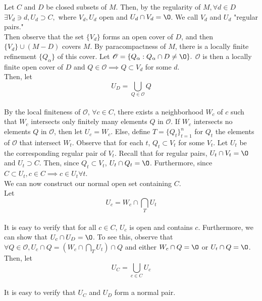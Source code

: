 \documentclass[paper=a4, fontsize=11pt]{scrartcl} %
\numberwithin{equation}{section} %
\numberwithin{figure}{section} %
\numberwithin{table}{section} %
\begin{document}
Let $C$ and $D$ be closed subsets of $M$. Then, by the regularity of $M, \forall d \in D$  $\exists V_d \ni d, U_d \supset C,$ where $V_d, U_d$ open and $U_d \cap V_d = \O $. We call $V_d$ and $U_d$ "regular pairs." \\

Then observe that the set $\{V_d\}$ forms an open cover of $D$, and then $\{V_d\} \cup (M - D)$ covers $M$. By paracompactness of $M$, there is a locally finite refinement $\{Q_{\alpha}\}$ of this cover. Let $\mathscr{O}  = \{Q_{\alpha} : Q_{\alpha} \cap D \not = \O \}.$ $\mathscr{O}$ is then a locally finite open cover of $D$ and $Q \in \mathscr{O} \implies Q \subset V_d$ for some $d$. \\

Then, let \[U_D = \bigcup_{Q \in \mathscr{O} } Q \] \\

By the local finiteness of $ \mathscr{O} $, $ \forall c \in C$, there exists a neighborhood $W_c$ of  $c$ such that $W_c$ intersects only finitely many elements $Q$ in  $\mathscr{O}$. If $W_c$ intersects no elements $Q$ in  $\mathscr{O}$, then let $U_c = W_c$. Else, define $T = \{ Q_t\}_{t = 1}^{n} $ for $Q_t$ the elements of $\mathscr{O}$ that intersect $W_t$. Observe that for each $t$, $Q_t \subset V_t$ for some $V_t$. Let $U_t$ be the corresponding regular pair of $V_t$. Recall that for regular pairs, $U_t \cap V_t = \O$ and $U_t \supset C$. Then, since $Q_t \subset V_t$, $U_t \cap Q_t = \O$. Furthermore, since $C \subset U_t, c \in C \implies c \in U_t \forall t$. \\

We can now construct our normal open set containing $C$. \\ Let \[ U_c = W_c \cap \bigcap_T U_t  \] \\
It is easy to verify that for all $c \in C$, $U_c$ is open and contains $c$. Furthermore, we can show that $U_c \cap U_D = \O $. To see this, observe that $\forall Q \in \mathscr{O}, U_c \cap Q = (W_c \cap \bigcap_T U_t) \cap Q$ and either $W_c \cap Q = \O$ or $U_t \cap Q = \O$. \\

Then, let  \[ U_C = \bigcup_{c \in C}U_c \] \\

It is easy to verify that $U_C$ and $U_D$ form a normal pair.



\end{document}
